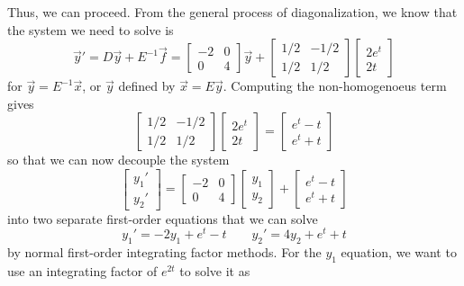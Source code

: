 \begin{exampleSol}
Thus, we can proceed. From the general process of diagonalization, we know that the system we need to solve is
\begin{equation*}
\vec{y}' = D\vec{y} + E^{-1}\vec{f} = \begin{bmatrix} -2 & 0 \\ 0 & 4 \end{bmatrix} \vec{y} + \begin{bmatrix} 1/2 & -1/2 \\ 1/2 & 1/2 \end{bmatrix} \begin{bmatrix} 2e^t \\ 2t \end{bmatrix}
\end{equation*}
for $\vec{y} = E^{-1}\vec{x}$, or $\vec{y}$ defined by $\vec{x} = E\vec{y}$. Computing the non-homogenoeus term gives
\begin{equation*}
\begin{bmatrix} 1/2 & -1/2 \\ 1/2 & 1/2 \end{bmatrix} \begin{bmatrix} 2e^t \\ 2t \end{bmatrix} = \begin{bmatrix} e^t - t \\ e^t + t \end{bmatrix}
\end{equation*}
so that we can now decouple the system
\begin{equation*}
\begin{bmatrix} y_1' \\ y_2' \end{bmatrix}  = \begin{bmatrix} -2 & 0 \\ 0 & 4 \end{bmatrix} \begin{bmatrix} y_1 \\ y_2 \end{bmatrix} + \begin{bmatrix} e^t - t \\ e^t + t \end{bmatrix}
\end{equation*}
into two separate first-order equations that we can solve
\begin{equation*}
y_1' = -2y_1 + e^t - t \qquad y_2' = 4y_2 + e^t + t
\end{equation*}
by normal first-order integrating factor methods. For the $y_1$ equation, we want to use an integrating factor of $e^{2t}$ to solve it as

\end{exampleSol}
